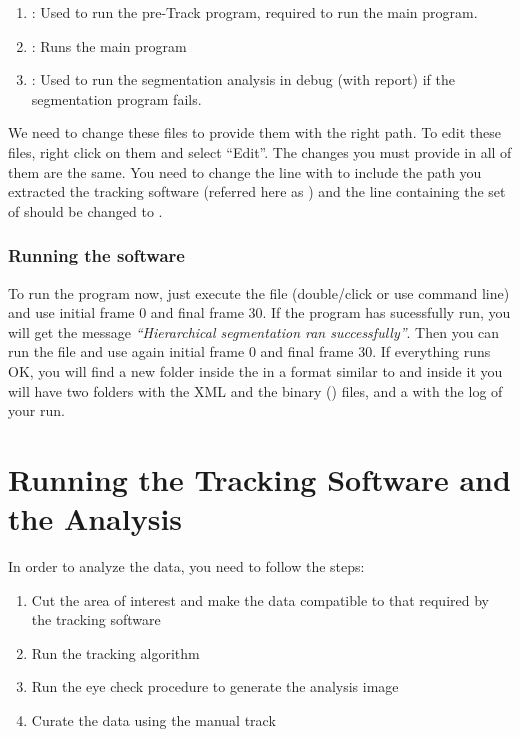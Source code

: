 \documentclass[12pt]{article}
\begin{document}
\begin{enumerate}
\item{: Used to run the pre-Track program, required to run the main program.}
\item{: Runs the main program}
\item{: Used to run the segmentation analysis in debug (with report) if the segmentation program fails.}
\end{enumerate}

We need to change these files to provide them with the right path. To edit these files, right click on them and select ``Edit''. The changes you must provide in all of them are the same. You need to change the line with  to include the path you extracted the tracking software (referred here as ) and the line containing the set of  should be changed to .

\subsubsection{Running the software} \label{sec_run_c_tracking}

To run the program now, just execute the file  (double/click or use command line) and use initial frame 0 and final frame 30. If the program has sucessfully run, you will get the message \textit{``Hierarchical segmentation ran successfully''}. Then you can run the file  and use again initial frame 0 and final frame 30. If everything runs OK, you will find a new folder inside the  in a format similar to  and inside it you will have two folders with the XML and the binary () files, and a  with the log of your run.

\section{Running the Tracking Software and the Analysis}

In order to analyze the data, you need to follow the steps:

\begin{enumerate}
\item{Cut the area of interest and make the data compatible to that required by the tracking software}
\item{Run the tracking algorithm}
\item{Run the eye check procedure to generate the analysis image}
\item{Curate the data using the manual track}
\end{enumerate}
\end{document}
